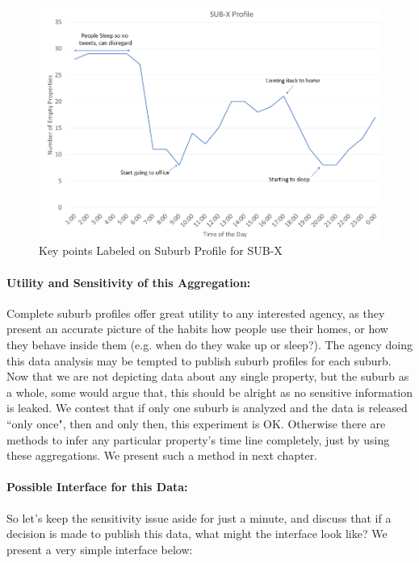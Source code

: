 \documentclass[12pt]{report}
\theoremstyle{named}
\begin{document}
\begin{figure}[ht]
\centering
        \includegraphics[width=150mm,scale=1]{Images/SubXProfileLabeled.png}
    \caption{Key points Labeled on Suburb Profile for SUB-X}
    \label{fig:SubXProfileLabeled}
\end{figure}



\paragraph{Utility and Sensitivity of this Aggregation:\\}
Complete suburb profiles offer great utility to any interested agency, as they present an accurate picture of the habits how people use their homes, or how they behave inside them (e.g. when do they wake up or sleep?). The agency doing this data analysis may be tempted to publish suburb profiles for each suburb. Now that we are not depicting data about any single property, but the suburb as a whole, some would argue that, this should be alright as no sensitive information is leaked. We contest that if only one suburb is analyzed and the data is released ``only once", then and only then, this experiment is OK. Otherwise there are methods to infer any particular property's time line completely, just by using these aggregations. We present such a method in next chapter. 

\paragraph{Possible Interface for this Data:\\}
So let's keep the sensitivity issue aside for just a minute, and discuss that if a decision is made to publish this data, what might the interface look like? We present a very simple interface below:
\end{document}
